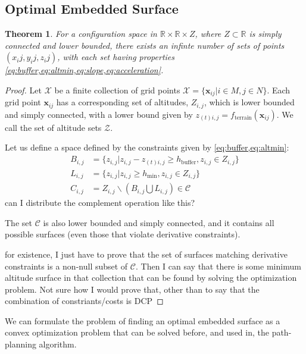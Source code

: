 \documentclass[letterpaper, 12pt]{article}
\def\xij{\mathbf{x}_{ij}}
\def\ztij{z_{(t) i,j}}
\def\zij{z_{i,j}}
\def\Zij{Z_{i,j}}
\newcommand{\mls}[1]{\color{teal}#1}
\newtheorem{theorem}{Theorem}[subsection]
\begin{document}
\subsection{Optimal Embedded Surface}

\begin{theorem}
    For a configuration space in $\mathbb{R} \times \mathbb{R} \times Z$, where $Z \subset \mathbb{R}$ is simply connected and lower bounded, there exists an infinte number of sets of points $(x_ij, y_ij, z_ij)$, with each set having properties \cref{eq:buffer,eq:altmin,eq:slope,eq:acceleration}.
\end{theorem}

\begin{proof}
    Let $\mathcal{X}$ be a finite collection of grid points $\mathcal{X} = \{\xij | i \in M, j \in N\}$. Each grid point $\xij$ has a corresponding set of altitudes, $\Zij$, which is lower bounded and simply connected, with a lower bound given by $\ztij = f_{\text{terrain}}(\xij)$. We call the set of altitude sets $\mathcal{Z}$.
    
    Let us define a space defined by the constraints given by \cref{eq:buffer,eq:altmin}:
    \begin{align}
        B_{i,j} &= \{ {\zij | \zij - \ztij \geq h_{\text{buffer}}, \zij \in \Zij} \} \\ \nonumber
        L_{i,j} &= \{ {\zij | \zij \geq h_{\text{min}}, \zij \in \Zij} \} \\ \nonumber
        C_{i,j} &= \Zij \backslash (B_{i,j} \bigcup L_{i,j}) \in \mathcal{C}
    \end{align}
    {\mls can I distribute the complement operation like this?}

    The set $\mathcal{C}$ is also lower bounded and simply connected, and it contains all possible surfaces (even those that violate derivative constraints).

    {\mls for existence, I just have to prove that the set of surfaces matching derivative constraints is a non-null subset of $\mathcal{C}$. Then I can say that there is some minimum altitude surface in that collection that can be found by solving the optimization problem. Not sure how I would prove that, other than to say that the combination of constriants/costs is DCP}
\end{proof}
We can formulate the problem of finding an optimal embedded surface as a convex optimization problem that can be solved before, and used in, the path-planning algorithm.
\end{document}
